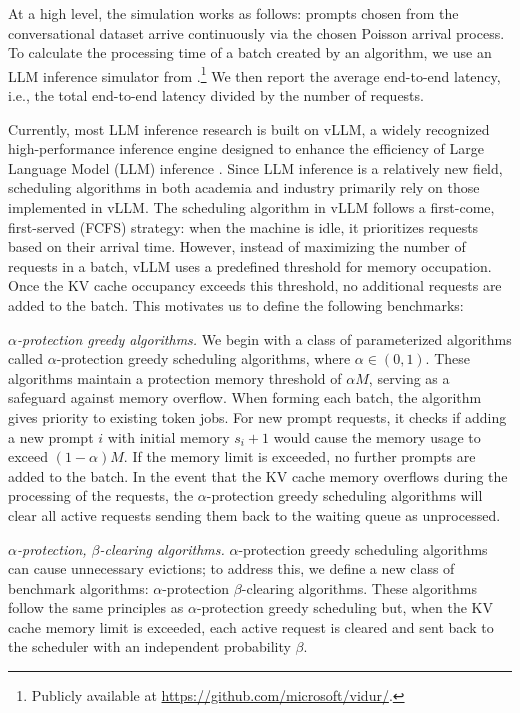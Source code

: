 \documentclass[11pt, a4paper]{article}
\theoremstyle{plain}
\theoremstyle{definition}
\theoremstyle{remark}
\newcommand{\xhdr}[1]{\vspace{1mm} \noindent{\bf #1}}
\begin{document}
At a high level, the simulation works as follows: prompts chosen from the conversational dataset arrive continuously via the chosen Poisson arrival process. To calculate the processing time of a batch created by an algorithm, we use {an} LLM inference simulator from \cite{agrawal2024vidur}.\footnote{Publicly available at \url{https://github.com/microsoft/vidur/}.}
We then report {the} average end-to-end latency,
i.e., the total end-to-end latency divided by the number of requests.


\xhdr{Benchmark Algorithms.} Currently, most LLM inference research is built on vLLM, a widely recognized high-performance inference engine designed to enhance the efficiency of Large Language Model (LLM) inference \citep{kwon2023efficient}. Since LLM inference is a relatively new field, scheduling algorithms in both academia and industry primarily rely on those implemented in vLLM. The scheduling algorithm in vLLM follows a first-come, first-served (FCFS) strategy: when the machine is idle, it prioritizes requests based on their arrival time. However, instead of maximizing the number of requests in a batch, vLLM uses a predefined threshold for memory occupation. Once the KV cache occupancy exceeds this threshold, no additional requests are added to the batch. This motivates us to define the following benchmarks:

\textit{$\alpha$-protection greedy algorithms.} We begin with a class of parameterized algorithms called $\alpha$-protection greedy scheduling algorithms, where $\alpha \in (0,1)$. These algorithms maintain a protection memory threshold of $\alpha M$, serving as a safeguard against memory overflow. When forming each batch, the algorithm gives priority to existing token jobs. For new prompt requests, it checks if adding a new prompt $i$ with initial memory $s_i+1$ would cause the memory usage to exceed $(1-\alpha)M$. If the memory limit is exceeded, no further prompts are added to the batch. 
In the event that the KV cache memory overflows during the processing of the requests, the $\alpha$-protection greedy scheduling algorithms will clear all active requests sending them back to the waiting queue as unprocessed. 


 


\textit{$\alpha$-protection, $\beta$-clearing algorithms.} $\alpha$-protection greedy scheduling algorithms can cause unnecessary evictions; to address this, we define a new class of benchmark algorithms: $\alpha$-protection $\beta$-clearing algorithms. These algorithms follow the same principles as $\alpha$-protection greedy scheduling but, when the KV cache memory limit is exceeded, each active request is cleared and sent back to the scheduler with an independent probability $\beta$. 
\end{document}
